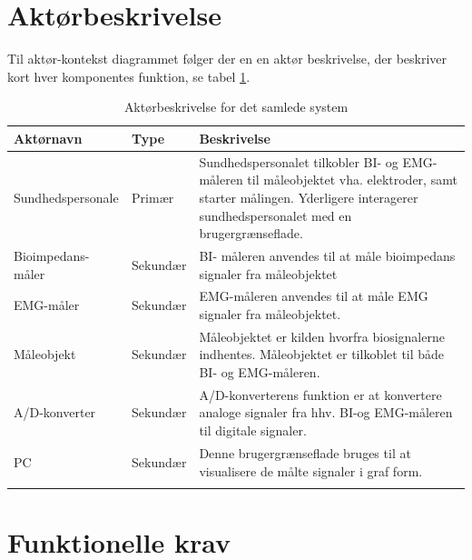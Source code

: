  

\section{Aktørbeskrivelse}
Til aktør-kontekst diagrammet følger der en en aktør beskrivelse, der beskriver kort hver komponentes funktion, se tabel \ref{tab:aktoerbeskrivelse}.    

\begin{table}[H]
\begin{tabularx}{\textwidth}{l l X}
     Aktørnavn	&	Type		&	Beskrivelse \\ \midrule
     Sundhedspersonale   	&  	Primær  	& 	Sundhedspersonalet tilkobler BI- og EMG-måleren til måleobjektet vha. elektroder, samt starter målingen. Yderligere interagerer sundhedspersonalet med en brugergrænseflade.     \\ 			  \addlinespace[2mm]
     Bioimpedans-måler	&	Sekundær	& BI- måleren anvendes til at måle bioimpedans signaler fra måleobjektet  	 \\   \addlinespace[2mm]

  EMG-måler	&	Sekundær	&	EMG-måleren anvendes til at måle EMG signaler fra måleobjektet.
     \\   \addlinespace[2mm]
    
    Måleobjekt	&	Sekundær	&	Måleobjektet er kilden  hvorfra biosignalerne indhentes. Måleobjektet er tilkoblet til både BI- og EMG-måleren.
     \\   \addlinespace[2mm]
     
 A/D-konverter	&	Sekundær	&	A/D-konverterens funktion er at konvertere analoge signaler fra hhv. BI-og EMG-måleren  til digitale signaler.
     \\   \addlinespace[2mm]      
    PC	&	Sekundær	&	Denne brugergrænseflade bruges til at visualisere de målte signaler i graf form.
     \\   \addlinespace[2mm]
     
   
     \bottomrule                                                                                                                   
    \end{tabularx}
    \caption {Aktørbeskrivelse for det samlede system}
    \label{tab:aktoerbeskrivelse}
	
\end{table}


\section{Funktionelle krav}

